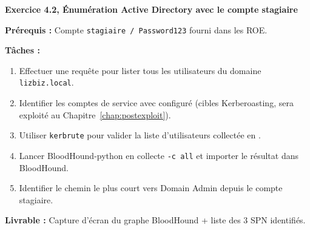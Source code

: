 \begin{boxexo}
\textbf{Exercice 4.2, Énumération Active Directory avec le compte stagiaire}

\medskip
\textbf{Prérequis :} Compte \texttt{stagiaire / Password123} fourni dans
les ROE.

\medskip
\textbf{Tâches :}
\begin{enumerate}
    \item Effectuer une requête  pour lister tous les utilisateurs
          du domaine \texttt{lizbiz.local}.
    \item Identifier les comptes de service avec  configuré
          (cibles Kerberoasting, sera exploité au
          Chapitre~\ref{chap:postexploit}).
    \item Utiliser \texttt{kerbrute} pour valider la liste d'utilisateurs
          collectée en .
    \item Lancer BloodHound-python en collecte \texttt{-c all} et importer
          le résultat dans BloodHound.
    \item Identifier le chemin le plus court vers \og{}Domain Admin\fg{}
          depuis le compte stagiaire.
\end{enumerate}

\medskip
\textbf{Livrable :} Capture d'écran du graphe BloodHound + liste des
3 SPN identifiés.
\end{boxexo}
